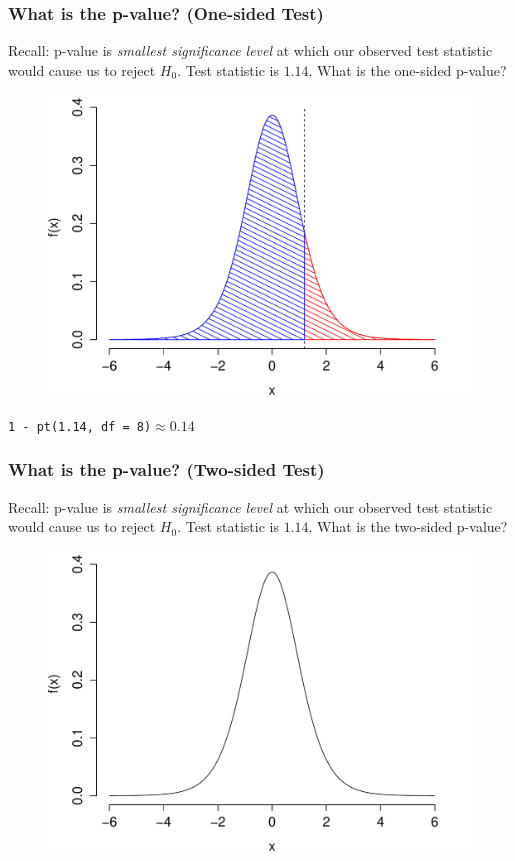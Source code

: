 \documentclass[handout]{beamer}
\begin{document}
\begin{frame}
\frametitle{What is the p-value? (One-sided Test)}
\footnotesize
Recall: p-value is \emph{smallest significance level} at which our observed test statistic would cause us to reject $H_0$. \alert{Test statistic is $1.14$. What is the one-sided p-value? }
\begin{figure}
\includegraphics[scale= 0.4]{./images/p_upper4}

\end{figure}
\texttt{1 - pt(1.14, df = 8)}$\approx 0.14$
\end{frame}

\begin{frame}
\frametitle{What is the p-value? (Two-sided Test)}
\footnotesize
Recall: p-value is \emph{smallest significance level} at which our observed test statistic would cause us to reject $H_0$. \alert{Test statistic is $1.14$. What is the two-sided p-value? }
\begin{figure}
\includegraphics[scale= 0.4]{./images/p_both1}

\end{figure}

\end{frame}
\end{document}
